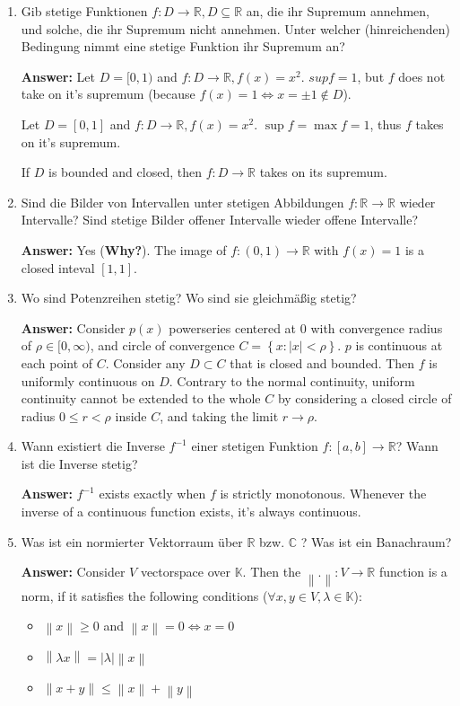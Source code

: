 \documentclass[11pt]{article}
\newcommand{\norm}[1]{\left\lVert#1\right\rVert}
\newcommand{\abs}[1]{\left|#1\right|}
\begin{document}
\begin{enumerate}
\item Gib stetige Funktionen $f\colon D \to \mathbb{R}, D \subseteq \mathbb{R}$ an, die ihr Supremum annehmen, und solche, die ihr Supremum nicht annehmen. Unter welcher (hinreichenden) Bedingung nimmt eine stetige Funktion ihr Supremum an?

\textbf{Answer:} Let $D = [0, 1)$ and $f\colon D \to \mathbb{R}, f(x) = x^2$. $sup f = 1$, but $f$ does not take on it's supremum (because $f(x) = 1 \Leftrightarrow x = \pm1 \notin D$).

Let $D = [0, 1]$ and $f\colon D \to \mathbb{R}, f(x) = x^2$. $\sup{f} = \max{f} = 1$, thus $f$ takes on it's supremum.

If $D$ is bounded and closed, then $f\colon D \to \mathbb{R}$ takes on its supremum.

\item Sind die Bilder von Intervallen unter stetigen Abbildungen $f\colon \mathbb{R} \to \mathbb{R}$ wieder Intervalle? Sind stetige Bilder offener Intervalle wieder offene Intervalle?

\textbf{Answer:} Yes (\textbf{Why?}). The image of $f\colon (0, 1) \to \mathbb{R}$ with $f(x) = 1$ is a closed inteval $[1, 1]$.

\item Wo sind Potenzreihen stetig? Wo sind sie gleichmäßig stetig?

\textbf{Answer:} Consider $p(x)$ powerseries centered at $0$ with convergence radius of $\rho \in [0, \infty)$, and circle of convergence $C = \left\{x\colon |x| < \rho\right\}$. $p$ is continuous at each point of $C$. Consider any $D \subset C$ that is closed and bounded. Then $f$ is uniformly continuous on $D$. Contrary to the normal continuity, uniform continuity cannot be extended to the whole $C$ by considering a closed circle of radius $0 \le r < \rho$ inside $C$, and taking the limit $r \to \rho$.

\item Wann existiert die Inverse $f^{-1}$ einer stetigen Funktion $f\colon [a, b] \to \mathbb{R}$? Wann ist die Inverse stetig?

\textbf{Answer:} $f^{-1}$ exists exactly when $f$ is strictly monotonous. Whenever the inverse of a continuous function exists, it's always continuous.

\item Was ist ein normierter Vektorraum über $\mathbb{R}$ bzw. $\mathbb{C}$ ? Was ist ein Banachraum?

\textbf{Answer:} Consider $V$ vectorspace over $\mathbb{K}$. Then the $\norm{.}\colon V \to \mathbb{R}$ function is a norm, if it satisfies the following conditions ($\forall x, y \in V, \lambda \in \mathbb{K}$):
\begin{itemize}
    \item $\norm{x} \ge 0$ and $\norm{x} = 0 \Leftrightarrow x = 0$
    \item $\norm{\lambda x} = \abs{\lambda}\norm{x}$
    \item $\norm{x + y} \le \norm{x} + \norm{y}$
\end{itemize}


\end{enumerate}
\end{document}
